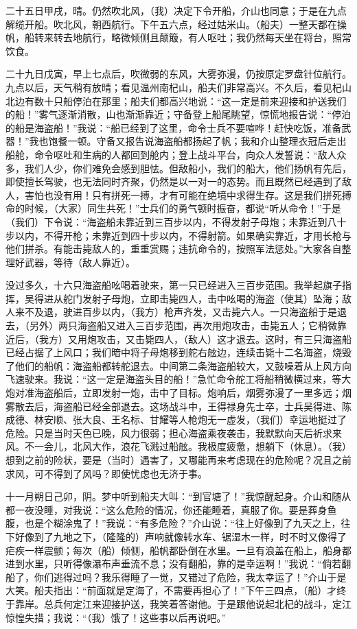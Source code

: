 \documentclass[12pt,UTF-8,openany]{ctexbook}
\begin{document}
\begin{normalsize}
    二十五日甲戌，晴。仍然吹北风，（我）决定下令开船，介山也同意；于是在九点解缆开船。吹北风，朝西航行。下午五六点，经过姑米山。（船夫）一整天都在操帆，船转来转去地航行，略微倾侧且颠簸，有人呕吐；我仍然每天坐在将台，照常饮食。
    
    二十九日戊寅，早上七点后，吹微弱的东风，大雾弥漫，仍按原定罗盘针位航行。九点以后，天气稍有放晴；看见温州南杞山，船夫们非常高兴。不久后，看见杞山北边有数十只船停泊在那里；船夫们都高兴地说：“这一定是前来迎接和护送我们的船！”雾气逐渐消散，山也渐渐靠近；守备登上船尾眺望，惊慌地报告说：“停泊的船是海盗船！”我说：“船已经到了这里，命令士兵不要喧哗！赶快吃饭，准备武器！”我也饱餐一顿。守备又报告说海盗船都扬起了帆；我和介山整理衣冠后走出船舱，命令呕吐和生病的人都回到舱内；登上战斗平台，向众人发誓说：“敌人众多，我们人少，你们难免会感到胆怯。但敌船小，我们的船大，他们扬帆有先后，即使擅长驾驶，也无法同时齐聚，仍然是以一对一的态势。而且既然已经遇到了敌人，害怕也没有用！只有拼死一搏，才有可能在绝境中求得生存。这是我们拼死搏命的时候，（大家）同生共死！”士兵们的勇气顿时振奋，都说“听从命令！”于是（我们）下令说：“海盗船未靠近到三百步以内，不得发射子母炮；未靠近到八十步以内，不得开枪；未靠近到四十步以内，不得射箭。如果确实靠近，才用长枪与他们拼杀。有能击毙敌人的，重重赏赐；违抗命令的，按照军法惩处。”大家各自整理好武器，等待（敌人靠近）。
    
    没过多久，十六只海盗船吆喝着驶来，第一只已经进入三百步范围。我举起旗子指挥，吴得进从舵门发射子母炮，立即击毙四人，击中吆喝的海盗（使其）坠海；敌人来不及退，驶进百步以内，（我方）枪声齐发，又击毙六人。一只海盗船于是退去，（另外）两只海盗船又进入三百步范围，再次用炮攻击，击毙五人；它稍微靠近后，（我方）又用炮攻击，又击毙四人，（敌人）这才退去。这时，有三只海盗船已经占据了上风口；我们暗中将子母炮移到舵右舷边，连续击毙十二名海盗，烧毁了他们的船帆：海盗船都转舵退去。中间第二条海盗船较大，又鼓噪着从上风方向飞速驶来。我说：“这一定是海盗头目的船！”急忙命令舵工将船稍微横过来，等大炮对准海盗船后，立即发射一炮，击中了目标。炮响后，烟雾弥漫了一里多远；烟雾散去后，海盗船已经全部退去。这场战斗中，王得禄身先士卒，士兵吴得进、陈成德、林安顺、张大良、王名标、甘耀等人枪炮无一虚发，（我们）幸运地挺过了危险。只是当时天色已晚，风力很弱；担心海盗乘夜袭击，我默默向天后祈求来风。不一会儿，北风大作，浪花飞溅过船舷。我极度疲惫，想躺下（休息）。（我）想到之前的险状，要是（当时）遇害了，又哪能再来考虑现在的危险呢？况且之前求风，可不得到了风吗？即使忧虑也无济于事。
    
    十一月朔日己卯，阴。梦中听到船夫大叫：“到官塘了！”我惊醒起身。介山和随从都一夜没睡，对我说：“这么危险的情况，你还能睡着，真服了你。要是葬身鱼腹，也是个糊涂鬼了！”我说：“有多危险？”介山说：“往上好像到了九天之上，往下好像到了九地之下，（隆隆的）声响就像转水车、锯湿木一样，时不时又像得了疟疾一样震颤；每次（船）倾侧，船帆都卧倒在水里。一旦有浪盖在船上，船身都进到水里，只听得像瀑布声垂流不息；没有翻船，靠的是幸运啊！”我说：“倘若翻船了，你们逃得过吗？我乐得睡了一觉，又错过了危险，我太幸运了！”介山于是大笑。船夫指出：“前面就是定海了，不需要再担心了！”下午三四点，（船）才终于靠岸。总兵何定江来迎接护送，我笑着答谢他。于是跟他说起北杞的战斗，定江惊惶失措；我说：“（我）饿了！这些事以后再说吧。”
    
\end{normalsize}
\end{document}
